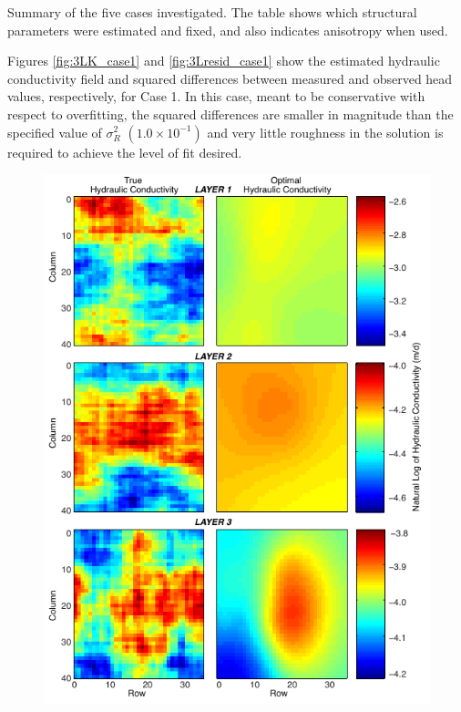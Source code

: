 \documentclass[11pt,oneside,onecolumn]{usgsreport}
\begin{document}
\begin{appendix}
\begin{table}[!t]
\caption{\label{tab:3lay}Summary of the five cases investigated. The table
shows which structural parameters were estimated and fixed, and also
indicates anisotropy when used. }


\end{table}


Figures \ref{fig:3LK_case1} and \ref{fig:3Lresid_case1} show the
estimated hydraulic conductivity field and squared differences between
measured and observed head values, respectively, for Case 1. In this
case, meant to be conservative with respect to overfitting, the squared
differences are smaller in magnitude than the specified value of $\sigma_{R}^{2}$
$\left(1.0\times10^{-1}\right)$ and very little roughness in the
solution is required to achieve the level of fit desired.

\clearpage

\begin{figure}[!t]
\begin{center}\includegraphics{figures/3KL_case1}\end{center}


\end{figure}
\end{appendix}
\end{document}
